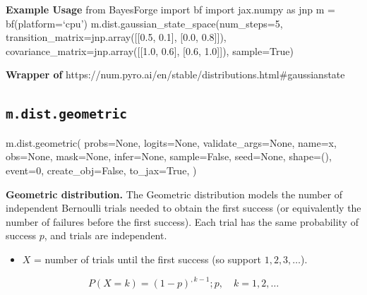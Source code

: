 \documentclass[
  letterpaper,
  DIV=11,
  numbers=noendperiod]{scrartcl}
\newenvironment{Shaded}{\begin{snugshade}}{\end{snugshade}}
\newcommand{\DecValTok}[1]{\textcolor[rgb]{0.68,0.00,0.00}{#1}}
\newcommand{\NormalTok}[1]{\textcolor[rgb]{0.00,0.23,0.31}{#1}}
\newcommand{\OperatorTok}[1]{\textcolor[rgb]{0.37,0.37,0.37}{#1}}
\newcommand{\StringTok}[1]{\textcolor[rgb]{0.13,0.47,0.30}{#1}}
\newcommand{\VariableTok}[1]{\textcolor[rgb]{0.07,0.07,0.07}{#1}}
\providecommand{\tightlist}{%
  \setlength{\itemsep}{0pt}\setlength{\parskip}{0pt}}\usepackage{longtable,booktabs,array}
\begin{document}
\textbf{Example Usage} from BayesForge import bf import jax.numpy as jnp
m = bf(platform=`cpu') m.dist.gaussian\_state\_space(num\_steps=5,
transition\_matrix=jnp.array({[}{[}0.5, 0.1{]}, {[}0.0, 0.8{]}{]}),
covariance\_matrix=jnp.array({[}{[}1.0, 0.6{]}, {[}0.6, 1.0{]}{]}),
sample=True)

\textbf{Wrapper of}
https://num.pyro.ai/en/stable/distributions.html\#gaussianstate

\subsection{\texorpdfstring{\texttt{m.dist.geometric}}{m.dist.geometric}}\label{geometric}

\begin{Shaded}
\begin{Highlighting}[]
\NormalTok{m.dist.geometric(}
\NormalTok{    probs}\OperatorTok{=}\VariableTok{None}\NormalTok{,}
\NormalTok{    logits}\OperatorTok{=}\VariableTok{None}\NormalTok{,}
\NormalTok{    validate\_args}\OperatorTok{=}\VariableTok{None}\NormalTok{,}
\NormalTok{    name}\OperatorTok{=}\StringTok{\textquotesingle{}x\textquotesingle{}}\NormalTok{,}
\NormalTok{    obs}\OperatorTok{=}\VariableTok{None}\NormalTok{,}
\NormalTok{    mask}\OperatorTok{=}\VariableTok{None}\NormalTok{,}
\NormalTok{    infer}\OperatorTok{=}\VariableTok{None}\NormalTok{,}
\NormalTok{    sample}\OperatorTok{=}\VariableTok{False}\NormalTok{,}
\NormalTok{    seed}\OperatorTok{=}\VariableTok{None}\NormalTok{,}
\NormalTok{    shape}\OperatorTok{=}\NormalTok{(),}
\NormalTok{    event}\OperatorTok{=}\DecValTok{0}\NormalTok{,}
\NormalTok{    create\_obj}\OperatorTok{=}\VariableTok{False}\NormalTok{,}
\NormalTok{    to\_jax}\OperatorTok{=}\VariableTok{True}\NormalTok{,}
\NormalTok{)}
\end{Highlighting}
\end{Shaded}

\textbf{Geometric distribution.} The Geometric distribution models the
number of independent Bernoulli trials needed to obtain the first
success (or equivalently the number of failures before the first
success). Each trial has the same probability of success \(p\), and
trials are independent.

\begin{itemize}
\tightlist
\item
  \(X\) = number of trials until the first success (so support
  \(1,2,3,\dots\)).
\end{itemize}

\[
P(X = k) = (1 - p)^{,k-1} ; p,\quad k = 1,2,\dots
\]
\end{document}
